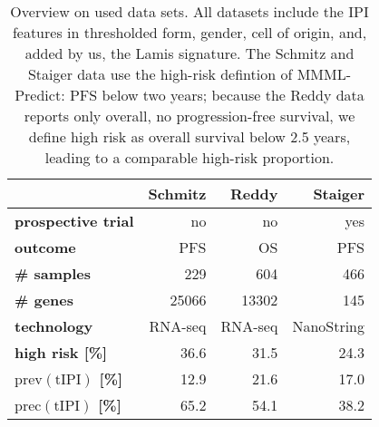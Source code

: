 \begin{table}
    \centering
    \begin{tabular}{lrrr}
        \hline
        & \textbf{Schmitz} & \textbf{Reddy} & \textbf{Staiger} \\
        \hline
        \textbf{prospective trial} & no & no & yes \\
        \textbf{outcome} & PFS & OS & PFS \\
        \textbf{\# samples} & \num{229} & \num{604} & \num{466} \\
        \textbf{\# genes} & \num{25066} & \num{13302} & \num{145} \\
        \textbf{technology} & RNA-seq & RNA-seq & NanoString \\
        \textbf{high risk [\%]} & \num{36.6} & \num{31.5} & \num{24.3} \\
        \textbf{$\text{prev}(\text{tIPI})$ [\%]} & \num{12.9} & \num{21.6} & \num{17.0} \\
        \textbf{$\text{prec}(\text{tIPI})$ [\%]} & \num{65.2} & \num{54.1} & \num{38.2} \\
        \hline
    \end{tabular}
    \caption{Overview on used data sets. All datasets include the IPI features in thresholded form, 
        gender, cell of origin, and, added by us, the Lamis signature. The Schmitz and Staiger 
        data use the high-risk defintion of MMML-Predict: PFS below two years; 
        because the Reddy data reports only overall, no progression-free survival, we define high risk 
        as overall survival below \num{2.5} years, leading to a comparable high-risk proportion.}
        \label{table:data}
\end{table}